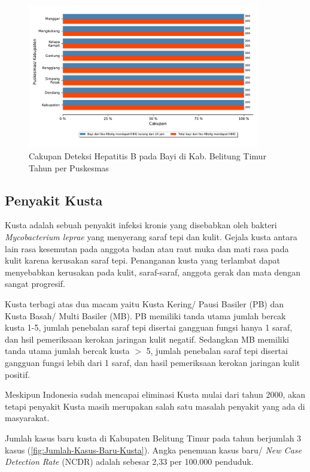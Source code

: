 \begin{figure}[H]
	\centering{}
	\includegraphics[width=0.9\textwidth]{bab_06/bab_06_05b_bayiHBIG}
	\caption{Cakupan Deteksi Hepatitis B pada Bayi di Kab. Belitung Timur Tahun \tP per Puskesmas}
	\label{fig:Cakupan-Bayi-HBIG}
\end{figure}

\subsection{Penyakit Kusta}
Kusta adalah sebuah penyakit infeksi kronis yang disebabkan oleh bakteri \emph{Mycobacterium leprae} yang menyerang saraf tepi dan kulit.
Gejala kusta antara lain rasa kesemutan pada anggota badan atau raut muka dan mati rasa pada kulit karena kerusakan saraf tepi.
Penanganan kusta yang terlambat dapat menyebabkan kerusakan pada kulit, saraf-saraf, anggota gerak dan mata dengan sangat progresif.

Kusta terbagi atas dua macam yaitu Kusta Kering/ Pausi Basiler (PB) dan Kusta Basah/ Multi Basiler (MB).
PB memiliki tanda utama jumlah bercak kusta 1-5, jumlah penebalan saraf tepi disertai gangguan fungsi hanya 1 saraf, dan hsil pemeriksaan kerokan jaringan kulit negatif.
Sedangkan MB memiliki tanda utama jumlah bercak kusta $>$ 5, jumlah penebalan saraf tepi disertai gangguan fungsi lebih dari 1 saraf, dan hasil pemeriksaan kerokan jaringan kulit positif.

Meskipun Indonesia sudah mencapai eliminasi Kusta mulai dari tahun 2000, akan tetapi penyakit Kusta masih merupakan salah satu masalah penyakit yang ada di masyarakat.

Jumlah kasus baru kusta di Kabupaten Belitung Timur pada tahun \tP berjumlah 3 kasus (\autoref{fig:Jumlah-Kasus-Baru-Kusta}).
Angka penemuan kasus baru/ \emph{New Case Detection Rate} (NCDR) adalah sebesar 2,33 per 100.000 penduduk.

